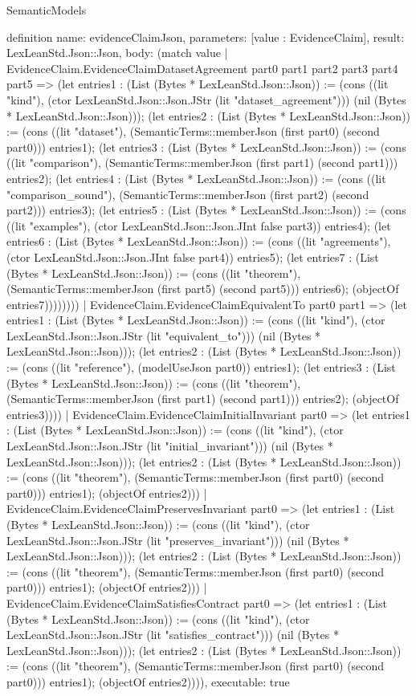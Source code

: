 \begin{lexlean}{SemanticModels}
\begin{semanticmodule}
definition{
  name: evidenceClaimJson,
  parameters: [value : EvidenceClaim],
  result: LexLeanStd.Json::Json,
  body: (match value
    | EvidenceClaim.EvidenceClaimDatasetAgreement part0 part1 part2 part3 part4 part5 => (let entries1 : (List (Bytes * LexLeanStd.Json::Json)) := (cons ((lit "kind"), (ctor LexLeanStd.Json::Json.JStr (lit "dataset_agreement"))) (nil (Bytes * LexLeanStd.Json::Json))); (let entries2 : (List (Bytes * LexLeanStd.Json::Json)) := (cons ((lit "dataset"), (SemanticTerms::memberJson (first part0) (second part0))) entries1); (let entries3 : (List (Bytes * LexLeanStd.Json::Json)) := (cons ((lit "comparison"), (SemanticTerms::memberJson (first part1) (second part1))) entries2); (let entries4 : (List (Bytes * LexLeanStd.Json::Json)) := (cons ((lit "comparison_sound"), (SemanticTerms::memberJson (first part2) (second part2))) entries3); (let entries5 : (List (Bytes * LexLeanStd.Json::Json)) := (cons ((lit "examples"), (ctor LexLeanStd.Json::Json.JInt false part3)) entries4); (let entries6 : (List (Bytes * LexLeanStd.Json::Json)) := (cons ((lit "agreements"), (ctor LexLeanStd.Json::Json.JInt false part4)) entries5); (let entries7 : (List (Bytes * LexLeanStd.Json::Json)) := (cons ((lit "theorem"), (SemanticTerms::memberJson (first part5) (second part5))) entries6); (objectOf entries7))))))))
    | EvidenceClaim.EvidenceClaimEquivalentTo part0 part1 => (let entries1 : (List (Bytes * LexLeanStd.Json::Json)) := (cons ((lit "kind"), (ctor LexLeanStd.Json::Json.JStr (lit "equivalent_to"))) (nil (Bytes * LexLeanStd.Json::Json))); (let entries2 : (List (Bytes * LexLeanStd.Json::Json)) := (cons ((lit "reference"), (modelUseJson part0)) entries1); (let entries3 : (List (Bytes * LexLeanStd.Json::Json)) := (cons ((lit "theorem"), (SemanticTerms::memberJson (first part1) (second part1))) entries2); (objectOf entries3))))
    | EvidenceClaim.EvidenceClaimInitialInvariant part0 => (let entries1 : (List (Bytes * LexLeanStd.Json::Json)) := (cons ((lit "kind"), (ctor LexLeanStd.Json::Json.JStr (lit "initial_invariant"))) (nil (Bytes * LexLeanStd.Json::Json))); (let entries2 : (List (Bytes * LexLeanStd.Json::Json)) := (cons ((lit "theorem"), (SemanticTerms::memberJson (first part0) (second part0))) entries1); (objectOf entries2)))
    | EvidenceClaim.EvidenceClaimPreservesInvariant part0 => (let entries1 : (List (Bytes * LexLeanStd.Json::Json)) := (cons ((lit "kind"), (ctor LexLeanStd.Json::Json.JStr (lit "preserves_invariant"))) (nil (Bytes * LexLeanStd.Json::Json))); (let entries2 : (List (Bytes * LexLeanStd.Json::Json)) := (cons ((lit "theorem"), (SemanticTerms::memberJson (first part0) (second part0))) entries1); (objectOf entries2)))
    | EvidenceClaim.EvidenceClaimSatisfiesContract part0 => (let entries1 : (List (Bytes * LexLeanStd.Json::Json)) := (cons ((lit "kind"), (ctor LexLeanStd.Json::Json.JStr (lit "satisfies_contract"))) (nil (Bytes * LexLeanStd.Json::Json))); (let entries2 : (List (Bytes * LexLeanStd.Json::Json)) := (cons ((lit "theorem"), (SemanticTerms::memberJson (first part0) (second part0))) entries1); (objectOf entries2)))),
  executable: true
}


\end{semanticmodule}
\end{lexlean}
